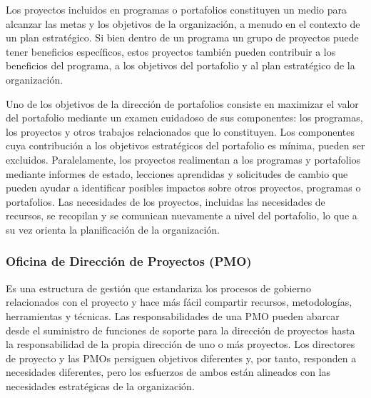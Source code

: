 Los proyectos incluidos en programas o portafolios constituyen un medio para alcanzar las metas y los objetivos de la organización, a menudo en el contexto de un plan estratégico. Si bien dentro de un programa un grupo de proyectos puede tener beneficios específicos, estos proyectos también pueden contribuir a los beneficios del programa, a los objetivos del portafolio y al plan estratégico de la organización.

Uno de los objetivos de la dirección de portafolios consiste en maximizar el valor del portafolio mediante un examen cuidadoso de sus componentes: los programas, los proyectos y otros trabajos relacionados que lo constituyen. Los componentes cuya contribución a los objetivos estratégicos del portafolio es mínima, pueden ser excluidos. Paralelamente, los proyectos realimentan a los programas y portafolios mediante informes de estado, lecciones aprendidas y solicitudes de cambio que pueden ayudar a identificar posibles impactos sobre otros proyectos, programas o portafolios. Las necesidades de los proyectos, incluidas las necesidades de recursos, se recopilan y se comunican nuevamente a nivel del portafolio, lo que a su vez orienta la planificación de la organización.

\subsubsection{Oficina de Dirección de Proyectos (PMO)}

Es una estructura de gestión que estandariza los procesos de gobierno relacionados con el proyecto y hace más fácil compartir recursos, metodologías, herramientas y técnicas. Las responsabilidades de una PMO pueden abarcar desde el suministro de funciones de soporte para la dirección de proyectos hasta la responsabilidad de la propia dirección de uno o más proyectos. Los directores de proyecto y las PMOs persiguen objetivos diferentes y, por tanto, responden a necesidades diferentes, pero los esfuerzos de ambos están alineados con las necesidades estratégicas de la organización.

